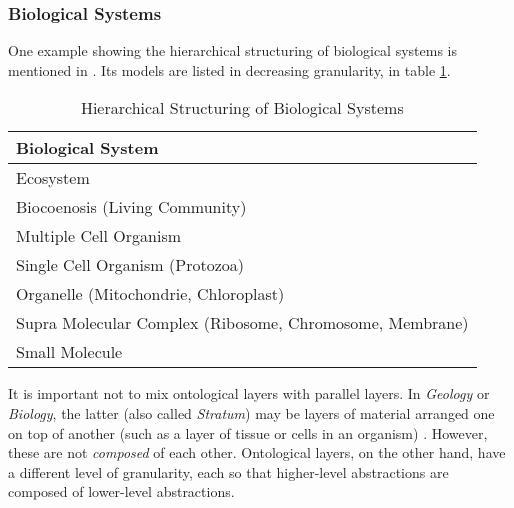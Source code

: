 %
%
%
%
%
%
%

\subsubsection{Biological Systems}
\label{biological_systems_heading}

One example showing the hierarchical structuring of biological systems is
mentioned in \cite{sengbusch}. Its models are listed in decreasing granularity,
in table \ref{biological_table}.

\begin{table}[ht]
    \begin{center}
        \begin{footnotesize}
        \begin{tabular}{| p{105mm} |}
            \hline
            \textbf{Biological System}\\
            \hline
            Ecosystem\\
            \hline
            Biocoenosis (Living Community)\\
            \hline
            Multiple Cell Organism\\
            \hline
            Single Cell Organism (Protozoa)\\
            \hline
            Organelle (Mitochondrie, Chloroplast)\\
            \hline
            Supra Molecular Complex (Ribosome, Chromosome, Membrane)\\
            \hline
            Small Molecule\\
            \hline
        \end{tabular}
        \end{footnotesize}
        \caption{Hierarchical Structuring of Biological Systems}
        \label{biological_table}
    \end{center}
\end{table}

It is important not to mix ontological layers with parallel layers. In
\emph{Geology} or \emph{Biology}, the latter (also called \emph{Stratum}) may
be layers of material arranged one on top of another (such as a layer of tissue
or cells in an organism) \cite{wordnet}. However, these are not \emph{composed}
of each other. Ontological layers, on the other hand, have a different level of
granularity, each so that higher-level abstractions are composed of lower-level
abstractions.
